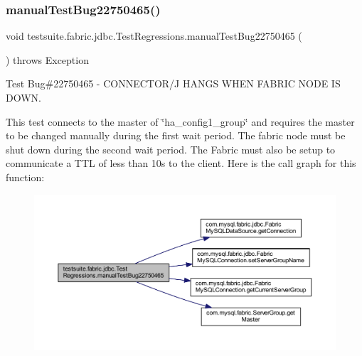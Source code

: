 \subsubsection{\texorpdfstring{manual\+Test\+Bug22750465()}{manualTestBug22750465()}}
{\footnotesize\ttfamily void testsuite.\+fabric.\+jdbc.\+Test\+Regressions.\+manual\+Test\+Bug22750465 (\begin{DoxyParamCaption}{ }\end{DoxyParamCaption}) throws Exception}

Test Bug\#22750465 -\/ C\+O\+N\+N\+E\+C\+T\+O\+R/J H\+A\+N\+GS W\+H\+EN F\+A\+B\+R\+IC N\+O\+DE IS D\+O\+WN.

This test connects to the master of \char`\"{}ha\+\_\+config1\+\_\+group\char`\"{} and requires the master to be changed manually during the first wait period. The fabric node must be shut down during the second wait period. The Fabric must also be setup to communicate a T\+TL of less than 10s to the client. Here is the call graph for this function\+:
\nopagebreak
\begin{figure}[H]
\begin{center}
\leavevmode
\includegraphics[width=350pt]{classtestsuite_1_1fabric_1_1jdbc_1_1_test_regressions_a832cdff2250e770858c18a1143e689ad_cgraph}
\end{center}
\end{figure}
\mbox{\label{classtestsuite_1_1fabric_1_1jdbc_1_1_test_regressions_a97a6970c2925c2feddfeceac2e0a1d71}} 
